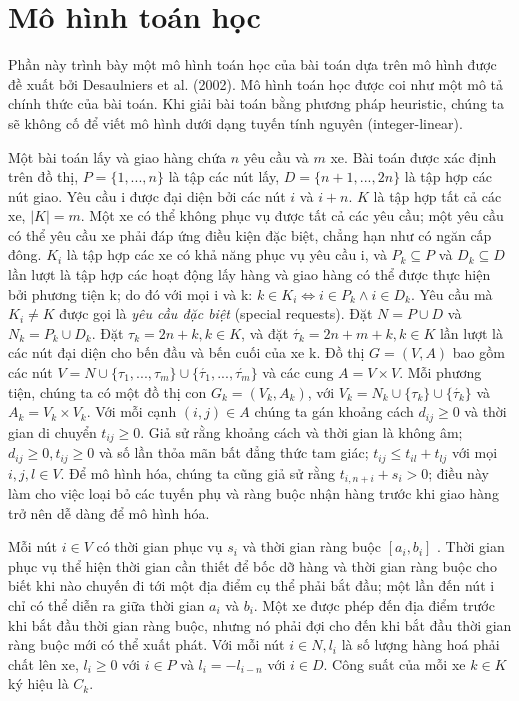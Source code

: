 \chapter{Mô hình toán học}
Phần này trình bày một mô hình toán học của bài toán dựa trên mô hình được đề xuất bởi Desaulniers et al. (2002). Mô hình toán học được coi như một mô tả chính thức của bài toán. Khi giải bài toán bằng phương pháp heuristic, chúng ta sẽ không cố để viết mô hình dưới dạng tuyến tính nguyên (integer-linear).

Một bài toán lấy và giao hàng chứa $n$ yêu cầu và $m$ xe. Bài toán được xác định trên đồ thị, $P = \{1,...,n\}$ là tập các nút lấy, $D=\{n+1,...,2n\}$ là tập hợp các nút giao. Yêu cầu i được đại diện bởi các nút $i$ và $i + n$. $K$ là tập hợp tất cả các xe, $|K|=m$. Một xe có thể không phục vụ được tất cả các yêu cầu; một yêu cầu có thể yêu cầu xe phải đáp ứng điều kiện đặc biệt, chẳng hạn như có ngăn cấp đông. $K_i$ là tập hợp các xe có khả năng phục vụ yêu cầu i, và $P_k \subseteq P$ và $D_k \subseteq D$ lần lượt là tập hợp các hoạt động lấy hàng và giao hàng có thể được thực hiện bởi phương tiện k; do đó với mọi i và k: $k \in K_i \Leftrightarrow i \in P_k \land i \in D_k $. Yêu cầu mà $K_i \ne K$ được gọi là \textit{yêu cầu đặc biệt} (special requests). Đặt $N = P \cup D$ và $N_k = P_k \cup D_k$. Đặt $\tau_k = 2n +k, k \in K$, và đặt $\acute{\tau_k} = 2n + m +k, k \in K$ lần lượt là các nút đại diện cho bến đầu và bến cuối của xe k. 
Đồ thị $G = (V,A)$ bao gồm các nút $V= N \cup \{ \tau_1,...,\tau_m\} \cup \{\acute{\tau_1},...,\acute{\tau_m}\}$ và các cung $A = V \times V$. Mỗi phương tiện, chúng ta có một đồ thị con $G_k = (V_k, A_k)$, với $V_k = N_k \cup \{\tau_k\} \cup \{\acute{\tau_k}\}$ và $A_k =V_k \times V_k$. Với mỗi cạnh $(i, j) \in A$ chúng ta gán khoảng cách $d_{ij} \geq 0$ và thời gian di chuyển $t_{ij} \geq 0$. Giả sử rằng khoảng cách và thời gian là không âm; $d_{ij} \geq 0, t_{ij} \geq 0$ và số lần thỏa mãn bất đẳng thức tam giác; $t_{ij} \leq t_{il} + t_{lj}$ với mọi $i, j, l \in V$.
Để mô hình hóa, chúng ta cũng giả sử rằng $t_{i,n+i} + s_i > 0$; điều này làm cho việc loại bỏ các tuyến phụ và ràng buộc nhận hàng trước khi giao hàng trở nên dễ dàng để mô hình hóa.

Mỗi nút $i \in V$ có thời gian phục vụ $s_i$ và thời gian ràng buộc $[a_i, b_i]$ . Thời gian phục vụ thể hiện thời gian cần thiết để bốc dỡ hàng và thời gian ràng buộc cho biết khi nào chuyến đi tới một địa điểm cụ thể phải bắt đầu; một lần đến nút i chỉ có thể diễn ra giữa thời gian $a_i$ và $b_i$. Một xe được phép đến địa điểm trước khi bắt đầu thời gian ràng buộc, nhưng nó phải đợi cho đến khi bắt đầu thời gian ràng buộc mới có thể xuất phát. Với mỗi nút $i \in N, l_i$ là số lượng hàng hoá phải chất lên xe, $l_i \geq 0$ với $i \in P$ và $l_i = -l_{i-n}$ với $i \in D$. Công suất của mỗi xe $k \in K$ ký hiệu là $C_k$.

